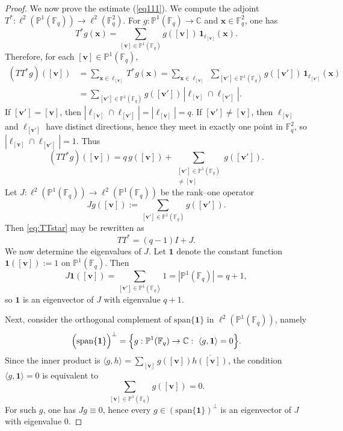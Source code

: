 \documentclass[11pt]{article}
\newcommand{\1}{\mathbf 1}
\begin{document}
\begin{proof}
We now prove the estimate (\ref{eq111}).
We compute the adjoint $T^\ast:\ell^2(\mathbb{P}^1(\mathbb{F}_q))\to \ell^2(\mathbb{F}_q^2)$.
For $g:\mathbb{P}^1(\mathbb{F}_q)\to\mathbb{C}$ and $\mathbf x\in\mathbb{F}_q^2$, one has
\[
T^\ast g(\mathbf x)=\sum_{[\mathbf{v}]\in\mathbb{P}^1(\mathbb{F}_q)} g([\mathbf{v}])\,\mathbf{1}_{\ell_{[\mathbf{v}]}}(\mathbf x).
\]
Therefore, for each $[\mathbf{v}]\in\mathbb{P}^1(\mathbb{F}_q)$,
\begin{align*}
(TT^\ast g)([\mathbf{v}])
&=
\sum_{\mathbf x \in\ell_{[\mathbf{v}]}} T^*g(\mathbf x)
=
\sum_{\mathbf x \in\ell_{[\mathbf{v}]}}\ \sum_{[\mathbf{v}']\in\mathbb{P}^1(\mathbb{F}_q)}
g([\mathbf{v}'])\,\mathbf{1}_{\ell_{[\mathbf{v}']}}(\mathbf x) \\
&=
\sum_{[\mathbf{v}']\in\mathbb{P}^1(\mathbb{F}_q)} g([\mathbf{v}'])\,|\ell_{[\mathbf{v}]}\cap \ell_{[\mathbf{v}']}|.
\end{align*}
If $[\mathbf{v}']=[\mathbf{v}]$, then $|\ell_{[\mathbf{v}]}\cap \ell_{[\mathbf{v}']}|=|\ell_{[\mathbf{v}]}|=q$.
If $[\mathbf{v}']\neq [\mathbf{v}]$, then $\ell_{[\mathbf{v}]}$ and $\ell_{[\mathbf{v}']}$ have distinct directions, hence they meet in exactly one point in $\mathbb{F}_q^2$, so $|\ell_{[\mathbf{v}]}\cap \ell_{[\mathbf{v}']}|=1$.
Thus
\begin{equation}\label{eq:TTstar}
(TT^\ast g)([\mathbf{v}])
=
q\,g([\mathbf{v}])
+
\sum_{\substack{[\mathbf{v}']\in\mathbb{P}^1(\mathbb{F}_q)\\ [\mathbf{v}']\neq [\mathbf{v}]}}
g([\mathbf{v}']).
\end{equation}
Let $J:\ell^2(\mathbb{P}^1(\mathbb{F}_q))\to \ell^2(\mathbb{P}^1(\mathbb{F}_q))$ be the rank--one operator
\[
Jg([\mathbf{v}]):=\sum_{[\mathbf{v}']\in\mathbb{P}^1(\mathbb{F}_q)} g([\mathbf{v}']).
\]
Then \eqref{eq:TTstar} may be rewritten as
\[
TT^\ast=(q-1)I+J.
\]
We now determine the eigenvalues of $J$.
Let $\mathbf{1}$ denote the constant function $\mathbf{1}([\mathbf{v}]):=1$ on $\mathbb{P}^1(\mathbb{F}_q)$.
Then
\[
J\mathbf{1}([\mathbf{v}])=\sum_{[\mathbf{v}']\in\mathbb{P}^1(\mathbb{F}_q)} 1
=
|\mathbb{P}^1(\mathbb{F}_q)|
=
q+1,
\]
so $\mathbf{1}$ is an eigenvector of $J$ with eigenvalue $q+1$.

Next, consider the orthogonal complement of $\mathrm{span}\{\mathbf{1}\}$ in
$\ell^2(\mathbb{P}^1(\mathbb{F}_q))$, namely
\[
\Bigl(\mathrm{span}\{\mathbf{1}\}\Bigr)^\perp
=
\Bigl\{g:\mathbb{P}^1(\mathbb{F}_q)\to\mathbb{C}:\ \langle g,\mathbf{1}\rangle=0\Bigr\}.
\]
Since the inner product is $\langle g,h\rangle=\sum\limits_{[\mathbf{v}]} g([\mathbf{v}])\overline{h([\mathbf{v}])}$, the condition
$\langle g,\mathbf{1}\rangle=0$ is equivalent to
\[
\sum_{[\mathbf{v}]\in\mathbb{P}^1(\mathbb{F}_q)} g([\mathbf{v}])=0.
\]
For such $g$, one has $Jg\equiv 0$, hence every $g\in(\mathrm{span}\{\mathbf{1}\})^\perp$ is an eigenvector of $J$ with eigenvalue $0$.


\end{proof}
\end{document}
